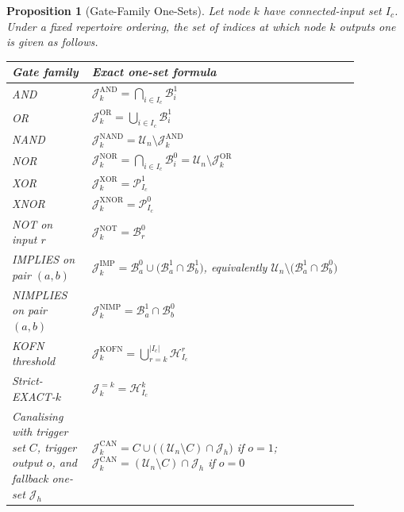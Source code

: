 \documentclass[11pt]{article}
\newtheorem{proposition}{Proposition}
\theoremstyle{definition}
\newcommand{\U}{\mathcal{U}_n}
\newcommand{\Ic}{I_c}
\newcommand{\J}{\mathcal{J}}
\newcommand{\Band}[2]{\mathcal{B}_{#1}^{#2}}
\newcommand{\Parity}[2]{\mathcal{P}_{#1}^{#2}}
\newcommand{\Weight}[2]{\mathcal{H}_{#1}^{#2}}
\begin{document}
\begin{proposition}[Gate-Family One-Sets]\label{prop:gate-family-one-sets}
Let node \(k\) have connected-input set \(\Ic\). Under a fixed repertoire ordering, the set of indices at which node \(k\) outputs one is given as follows.
\begin{center}
\small
\begin{tabular}{p{0.20\linewidth}p{0.67\linewidth}}
\toprule
\textbf{Gate family} & \textbf{Exact one-set formula} \\
\midrule
AND & \(\J_k^{\mathrm{AND}}=\bigcap_{i\in\Ic}\Band{i}{1}\) \\
OR & \(\J_k^{\mathrm{OR}}=\bigcup_{i\in\Ic}\Band{i}{1}\) \\
NAND & \(\J_k^{\mathrm{NAND}}=\U\setminus \J_k^{\mathrm{AND}}\) \\
NOR & \(\J_k^{\mathrm{NOR}}=\bigcap_{i\in\Ic}\Band{i}{0}=\U\setminus \J_k^{\mathrm{OR}}\) \\
XOR & \(\J_k^{\mathrm{XOR}}=\Parity{\Ic}{1}\) \\
XNOR & \(\J_k^{\mathrm{XNOR}}=\Parity{\Ic}{0}\) \\
NOT on input \(r\) & \(\J_k^{\mathrm{NOT}}=\Band{r}{0}\) \\
IMPLIES on pair \((a,b)\) & \(\J_k^{\mathrm{IMP}}=\Band{a}{0}\cup\bigl(\Band{a}{1}\cap\Band{b}{1}\bigr)\), equivalently \(\U\setminus\bigl(\Band{a}{1}\cap\Band{b}{0}\bigr)\) \\
NIMPLIES on pair \((a,b)\) & \(\J_k^{\mathrm{NIMP}}=\Band{a}{1}\cap\Band{b}{0}\) \\
KOFN threshold & \(\J_k^{\mathrm{KOFN}}=\bigcup_{r=k}^{|\Ic|}\Weight{\Ic}{r}\) \\
Strict-EXACT-\(k\) & \(\J_k^{=k}=\Weight{\Ic}{k}\) \\
Canalising with trigger set \(C\), trigger output \(o\), and fallback one-set \(\J_h\) & \(\J_k^{\mathrm{CAN}}=C\cup\bigl((\U\setminus C)\cap \J_h\bigr)\) if \(o=1\); \(\J_k^{\mathrm{CAN}}=(\U\setminus C)\cap \J_h\) if \(o=0\) \\
\bottomrule
\end{tabular}
\end{center}
\end{proposition}
\end{document}
